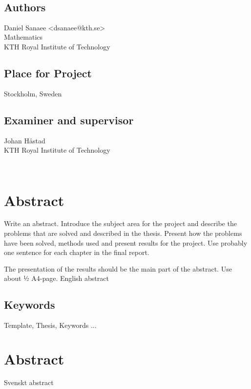 \newpage
\thispagestyle{plain}
~\\
\vfill
{ 
	\section*{Authors}
	Daniel Sanaee <dsanaee@kth.se>\\
	Mathematics\\
	KTH Royal Institute of Technology
	
	\section*{Place for Project}
	Stockholm, Sweden
	
	\section*{Examiner and supervisor}
	Johan Håstad\\
	KTH Royal Institute of Technology
	
	~
}

\newpage
\thispagestyle{plain}
\chapter*{Abstract}

\vspace{2cm}
Write an abstract. Introduce the subject area for the project and describe the problems that are solved and described in the thesis. Present how the problems have been solved, methods used and present results for the project. Use probably one sentence for each chapter in the final report.

The presentation of the results should be the main part of the abstract. Use about ½ A4-page.
English abstract




\section*{Keywords}
Template, Thesis, Keywords ...





\newpage
\thispagestyle{plain}
\chapter*{Abstract}
Svenskt abstract
\begin{comment}
Svensk version av abstract – samma titel på svenska som på engelska.

Skriv samma abstract på svenska. Introducera ämnet för projektet och beskriv problemen som löses i materialet. Presentera 
\end{comment}
